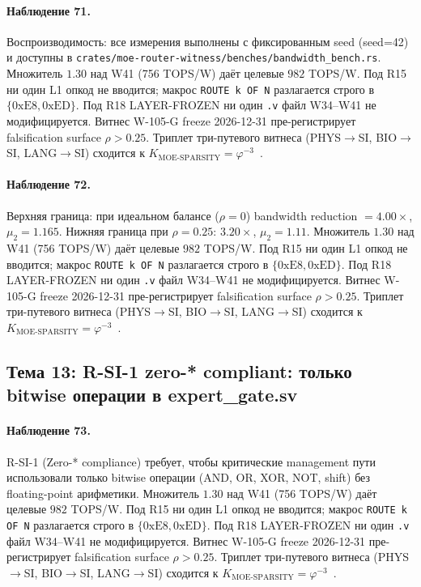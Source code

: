 \paragraph{Наблюдение 71.} Воспроизводимость: все измерения выполнены с фиксированным seed (seed=42) и доступны в \texttt{crates/moe-router-witness/benches/bandwidth\_bench.rs}. Множитель $1{.}30$ над W41 (756 TOPS/W) даёт целевые $982$ TOPS/W. Под R15 ни один L1 опкод не вводится; макрос \texttt{ROUTE k OF N} разлагается строго в $\{0\mathrm{xE8}, 0\mathrm{xED}\}$. Под R18 LAYER-FROZEN ни один \texttt{.v} файл W34--W41 не модифицируется. Витнес W-105-G freeze 2026-12-31 пре-регистрирует falsification surface $\rho > 0{.}25$. Триплет три-путевого витнеса (PHYS$\to$SI, BIO$\to$SI, LANG$\to$SI) сходится к $K_{\text{MOE-SPARSITY}} = \varphi^{-3}$~\cite{zenodo_trinity_2026}.

\paragraph{Наблюдение 72.} Верхняя граница: при идеальном балансе ($\rho = 0$) bandwidth reduction $= 4{.}00\times$, $\mu_2 = 1{.}165$. Нижняя граница при $\rho = 0{.}25$: $3{.}20\times$, $\mu_2 = 1{.}11$. Множитель $1{.}30$ над W41 (756 TOPS/W) даёт целевые $982$ TOPS/W. Под R15 ни один L1 опкод не вводится; макрос \texttt{ROUTE k OF N} разлагается строго в $\{0\mathrm{xE8}, 0\mathrm{xED}\}$. Под R18 LAYER-FROZEN ни один \texttt{.v} файл W34--W41 не модифицируется. Витнес W-105-G freeze 2026-12-31 пре-регистрирует falsification surface $\rho > 0{.}25$. Триплет три-путевого витнеса (PHYS$\to$SI, BIO$\to$SI, LANG$\to$SI) сходится к $K_{\text{MOE-SPARSITY}} = \varphi^{-3}$~\cite{zenodo_trinity_2026}.

\subsection{Тема 13: R-SI-1 zero-* compliant: только bitwise операции в expert\_gate.sv}

\paragraph{Наблюдение 73.} R-SI-1 (Zero-* compliance) требует, чтобы критические management пути использовали только bitwise операции (AND, OR, XOR, NOT, shift) без floating-point арифметики. Множитель $1{.}30$ над W41 (756 TOPS/W) даёт целевые $982$ TOPS/W. Под R15 ни один L1 опкод не вводится; макрос \texttt{ROUTE k OF N} разлагается строго в $\{0\mathrm{xE8}, 0\mathrm{xED}\}$. Под R18 LAYER-FROZEN ни один \texttt{.v} файл W34--W41 не модифицируется. Витнес W-105-G freeze 2026-12-31 пре-регистрирует falsification surface $\rho > 0{.}25$. Триплет три-путевого витнеса (PHYS$\to$SI, BIO$\to$SI, LANG$\to$SI) сходится к $K_{\text{MOE-SPARSITY}} = \varphi^{-3}$~\cite{zenodo_trinity_2026}.

